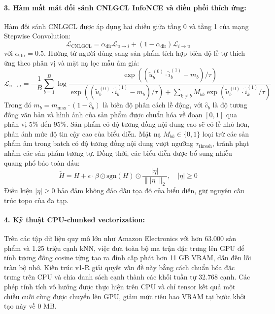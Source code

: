 \paragraph{3. Hàm mất mát đối sánh CNLGCL InfoNCE và điều phối thích ứng:}
Hàm đối sánh CNLGCL được áp dụng hai chiều giữa tầng 0 và tầng 1 của mạng Stepwise Convolution:
\begin{equation}
\mathcal{L}_{\text{CNLGCL}} = \alpha_{\text{dir}} \mathcal{L}_{u \to i} + (1 - \alpha_{\text{dir}}) \mathcal{L}_{i \to u}
\end{equation}
với $\alpha_{\text{dir}} = 0.5$. Hướng từ người dùng sang sản phẩm tích hợp biên độ lề tự thích ứng theo phân vị và mặt nạ lọc mẫu âm giả:
\begin{equation}
\mathcal{L}_{u \to i} = - \frac{1}{B} \sum_{b=1}^{B} \log \frac{\exp\left( (\tilde{u}_b^{(0)} \cdot \tilde{i}_b^{(1)} - m_b) / \tau \right)}{\exp\left( (\tilde{u}_b^{(0)} \cdot \tilde{i}_b^{(1)} - m_b) / \tau \right) + \sum_{k \ne b} M_{bk} \exp\left( \tilde{u}_b^{(0)} \cdot \tilde{i}_k^{(1)} / \tau \right)}
\end{equation}
Trong đó $m_b = m_{\max} \cdot (1 - \hat{c}_b)$ là biên độ phân cách lề động, với $\hat{c}_b$ là độ tương đồng văn bản và hình ảnh của sản phẩm được chuẩn hóa về đoạn $[0, 1]$ qua phân vị 5\% đến 95\%. Sản phẩm có độ tương đồng nội dung cao sẽ có lề nhỏ hơn, phản ánh mức độ tin cậy cao của biểu diễn. Mặt nạ $M_{bk} \in \{0, 1\}$ loại trừ các sản phẩm âm trong batch có độ tương đồng nội dung vượt ngưỡng $\tau_{\text{thresh}}$, tránh phạt nhầm các sản phẩm tương tự.
Đồng thời, các biểu diễn được bổ sung nhiễu quang phổ bảo toàn dấu:
\begin{equation}
\tilde{H} = H + \epsilon \cdot \beta \odot \text{sgn}(H) \odot \frac{|\eta|}{\| |\eta| \|_2}, \quad |\eta| \ge 0
\end{equation}
Điều kiện $|\eta| \ge 0$ bảo đảm không đảo dấu tọa độ của biểu diễn, giữ nguyên cấu trúc topo của đa tạp.

\paragraph{4. Kỹ thuật CPU-chunked vectorization:}
Trên các tập dữ liệu quy mô lớn như Amazon Electronics với hơn 63.000 sản phẩm và 1.25 triệu cạnh kNN, việc đưa toàn bộ ma trận đặc trưng lên GPU để tính tương đồng cosine từng tạo ra đỉnh cấp phát hơn 11 GB VRAM, dẫn đến lỗi tràn bộ nhớ. Kiến trúc v1-R giải quyết vấn đề này bằng cách chuẩn hóa đặc trưng trên CPU và chia danh sách cạnh thành các khối tuần tự 32.768 cạnh. Các phép tính tích vô hướng được thực hiện trên CPU và chỉ tensor kết quả một chiều cuối cùng được chuyển lên GPU, giảm mức tiêu hao VRAM tại bước khởi tạo này về 0 MB.

